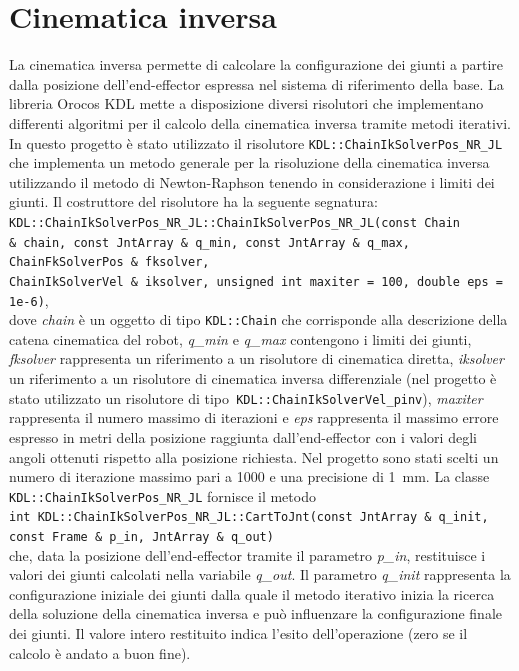 \section{Cinematica inversa} \label{cap_ik}
La cinematica inversa permette di calcolare la configurazione dei giunti a partire dalla posizione dell'end-effector espressa nel sistema di riferimento della base. La libreria Orocos 
KDL mette a disposizione diversi risolutori che implementano differenti algoritmi per il calcolo della cinematica inversa tramite metodi iterativi. In questo progetto è stato utilizzato il risolutore \texttt{KDL::ChainIkSolverPos\_NR\_JL} che implementa un metodo generale per la risoluzione della cinematica inversa utilizzando il metodo di Newton-Raphson tenendo in considerazione i limiti dei giunti. Il costruttore del risolutore ha la seguente segnatura: \\ \texttt{KDL::ChainIkSolverPos\_NR\_JL::ChainIkSolverPos\_NR\_JL(const Chain \&\ chain, const JntArray \&\ q\_min, const JntArray \&\ q\_max, ChainFkSolverPos \&\ fksolver, \\ ChainIkSolverVel \&\ iksolver, unsigned int	maxiter = 100, double eps = 1e-6)}, \\ dove \textit{chain} è un oggetto di tipo \texttt{KDL::Chain} che corrisponde alla descrizione della catena cinematica del robot, \textit{q\_min} e \textit{q\_max} contengono i limiti dei giunti, \textit{fksolver} rappresenta un riferimento a un risolutore di cinematica diretta, \textit{iksolver} un riferimento a un risolutore di cinematica inversa differenziale (nel progetto è stato utilizzato un risolutore di tipo\texttt{ KDL::ChainIkSolverVel\_pinv}), \textit{maxiter} rappresenta il numero massimo di iterazioni e \textit{eps} rappresenta il massimo errore espresso in metri della posizione raggiunta dall'end-effector con i valori degli angoli ottenuti rispetto alla posizione richiesta. Nel progetto sono stati scelti un numero di iterazione massimo pari a 1000 e una precisione di \SI{1}{\milli\meter}. 
La classe \texttt{KDL::ChainIkSolverPos\_NR\_JL} fornisce il metodo \\
\texttt{int KDL::ChainIkSolverPos\_NR\_JL::CartToJnt(const JntArray \&\ q\_init, const Frame \&\ p\_in, JntArray \&\	q\_out)} \\ che, data la posizione dell'end-effector tramite il parametro \textit{p\_in}, restituisce i valori dei giunti calcolati nella variabile \textit{q\_out}. Il parametro \textit{q\_init} rappresenta la configurazione iniziale dei giunti dalla quale il metodo iterativo inizia la ricerca della soluzione della cinematica inversa e può influenzare la configurazione finale dei giunti. Il valore intero restituito indica l'esito dell'operazione (zero se il calcolo è andato a buon fine).


